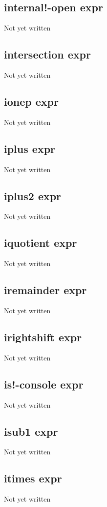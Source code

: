 \documentclass[a4paper,11pt]{article}
\begin{document}
\subsection{\ttfamily internal!-open expr}
Not yet written

\subsection{\ttfamily intersection expr}
Not yet written

\subsection{\ttfamily ionep expr}
Not yet written

\subsection{\ttfamily iplus expr}
Not yet written

\subsection{\ttfamily iplus2 expr}
Not yet written

\subsection{\ttfamily iquotient expr}
Not yet written

\subsection{\ttfamily iremainder expr}
Not yet written

\subsection{\ttfamily irightshift expr}
Not yet written

\subsection{\ttfamily is!-console expr}
Not yet written

\subsection{\ttfamily isub1 expr}
Not yet written

\subsection{\ttfamily itimes expr}
Not yet written
\end{document}
